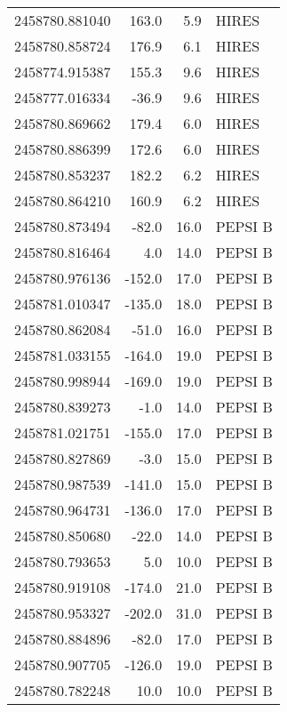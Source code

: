 \begin{tabular}{rrrl}
2458780.881040 &    163.0 &            5.9 &      HIRES \\
2458780.858724 &    176.9 &            6.1 &      HIRES \\
2458774.915387 &    155.3 &            9.6 &      HIRES \\
2458777.016334 &    -36.9 &            9.6 &      HIRES \\
2458780.869662 &    179.4 &            6.0 &      HIRES \\
2458780.886399 &    172.6 &            6.0 &      HIRES \\
2458780.853237 &    182.2 &            6.2 &      HIRES \\
2458780.864210 &    160.9 &            6.2 &      HIRES \\
2458780.873494 &    -82.0 &           16.0 &    PEPSI B \\
2458780.816464 &      4.0 &           14.0 &    PEPSI B \\
2458780.976136 &   -152.0 &           17.0 &    PEPSI B \\
2458781.010347 &   -135.0 &           18.0 &    PEPSI B \\
2458780.862084 &    -51.0 &           16.0 &    PEPSI B \\
2458781.033155 &   -164.0 &           19.0 &    PEPSI B \\
2458780.998944 &   -169.0 &           19.0 &    PEPSI B \\
2458780.839273 &     -1.0 &           14.0 &    PEPSI B \\
2458781.021751 &   -155.0 &           17.0 &    PEPSI B \\
2458780.827869 &     -3.0 &           15.0 &    PEPSI B \\
2458780.987539 &   -141.0 &           15.0 &    PEPSI B \\
2458780.964731 &   -136.0 &           17.0 &    PEPSI B \\
2458780.850680 &    -22.0 &           14.0 &    PEPSI B \\
2458780.793653 &      5.0 &           10.0 &    PEPSI B \\
2458780.919108 &   -174.0 &           21.0 &    PEPSI B \\
2458780.953327 &   -202.0 &           31.0 &    PEPSI B \\
2458780.884896 &    -82.0 &           17.0 &    PEPSI B \\
2458780.907705 &   -126.0 &           19.0 &    PEPSI B \\
2458780.782248 &     10.0 &           10.0 &    PEPSI B \\

\end{tabular}
